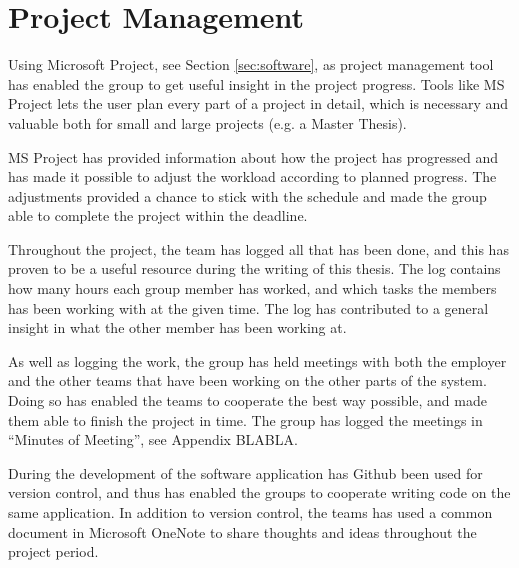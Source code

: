 \chapter{Project Management}
\label{cha:projectmanagement}
Using Microsoft Project, see Section \ref{sec:software}, as project management tool has enabled the group to get useful insight in the project progress. Tools like MS Project lets the user plan every part of a project in detail, which is necessary and valuable both for small and large projects (e.g. a Master Thesis).

MS Project has provided information about how the project has progressed and has made it possible to adjust the workload according to planned progress. The adjustments provided a chance to stick with the schedule and made the group able to complete the project within the deadline.

Throughout the project, the team has logged all that has been done, and this has proven to be a useful resource during the writing of this thesis. The log contains how many hours each group member has worked, and which tasks the members has been working with at the given time. The log has contributed to a general insight in what the other member has been working at.

As well as logging the work, the group has held meetings with both the employer and the other teams that have been working on the other parts of the system. Doing so has enabled the teams to cooperate the best way possible, and made them able to finish the project in time. The group has logged the meetings in ``Minutes of Meeting'', see Appendix BLABLA. 

During the development of the software application has Github   been used for version control, and thus has enabled the groups to cooperate writing code on the same application. In addition to version control, the teams has used a common document in Microsoft OneNote to share thoughts and ideas throughout the project period.